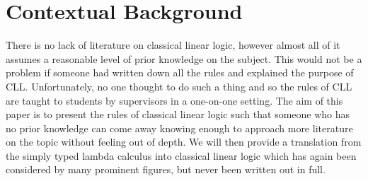 \chapter{Contextual Background}
\label{chap:context}


\noindent
There is no lack of literature on classical linear logic, however almost all of it assumes a reasonable 
level of prior knowledge on the subject. This would not be a problem if someone had written down all the 
rules and explained the purpose of CLL. Unfortunately, no one thought to do such a thing and so the rules 
of CLL are taught to students by supervisors in a one-on-one setting. The aim of this paper is to present 
the rules of classical linear logic such that someone who has no prior knowledge can come away knowing 
enough to approach more literature on the topic without feeling out of depth. We will then provide a 
translation from the simply typed lambda calculus into classical linear logic which has again been 
considered by many prominent figures, but never been written out in full. 





 
